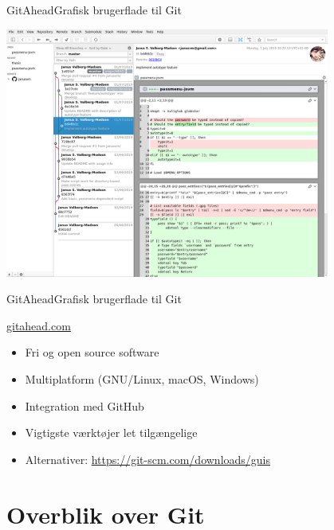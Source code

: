 \documentclass[10pt]{beamer}
\begin{document}
\begin{frame}{GitAhead}{Grafisk brugerflade til Git}
  \begin{center}
    \includegraphics[width=0.8\textwidth]{img/gitahead}
  \end{center}
\end{frame}

\begin{frame}{GitAhead}{Grafisk brugerflade til Git}
  \begin{block}{\url{gitahead.com}}
    \begin{itemize}
    \item Fri og open source software
    \item Multiplatform (GNU/Linux, macOS, Windows)
    \item Integration med GitHub
    \item Vigtigste værktøjer let tilgængelige
    \item Alternativer: \url{https://git-scm.com/downloads/guis}
    \end{itemize}
  \end{block}
\end{frame}

\section{Overblik over Git}
\label{sec:gitcmds}
\end{document}
